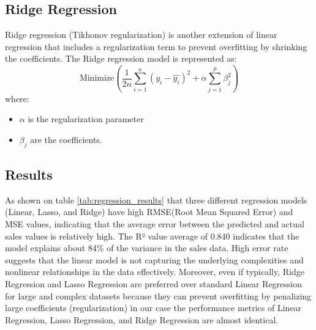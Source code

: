\documentclass[12pt]{report}
\begin{document}
\subsection{Ridge Regression}
Ridge regression (Tikhonov regularization) is another extension of linear regression that includes a regularization term to prevent overfitting by shrinking the coefficients. The Ridge regression model is represented as:
\[
\text{Minimize} \left( \frac{1}{2n} \sum_{i=1}^{n} \left( y_i - \hat{y_i} \right)^2 + \alpha \sum_{j=1}^{p} \beta_j^2 \right)
\]
where:
\begin{itemize}
    \item \( \alpha \) is the regularization parameter
    \item \( \beta_j \) are the coefficients.
\end{itemize}

\subsection{Results}

As shown on table \ref{tab:regression_results} that three different regression models (Linear, Lasso, and Ridge) have high RMSE(Root Mean Squared Error) and MSE values, indicating that the average error between the predicted and actual sales values is relatively high. The R² value average of 0.840 indicates that the model explains about 84\% of the variance in the sales data. High error rate suggests that the linear model is not capturing the underlying complexities and nonlinear relationships in the data effectively. 
Moreover, even if typically, Ridge Regression and Lasso Regression are preferred over standard Linear Regression for large and complex datasets because they can prevent overfitting by penalizing large coefficients (regularization) in our case the performance metrics of Linear Regression, Lasso Regression, and Ridge Regression are almost identical.

\end{document}
